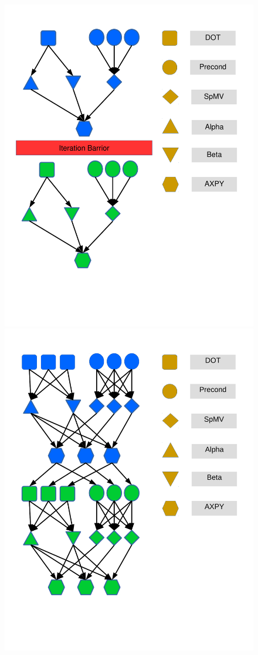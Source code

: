\begin{figure}[bhtp]
        \centerline{
                \includegraphics[scale=0.30]{ifcg/figs/charts/pcg.pdf}
                \includegraphics[scale=0.30]{ifcg/figs/charts/ifcg.pdf}
}
\end{figure}
